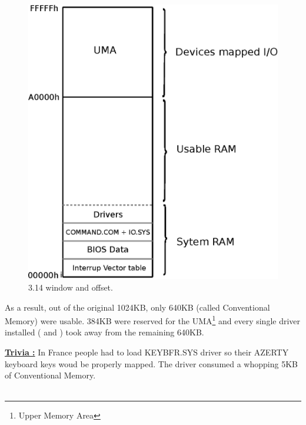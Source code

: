 \documentclass[book.tex]{subfiles}
\begin{document}
\begin{figure}[H]
\centering
\includegraphics[scale=1]{imgs/real_mode}

\caption{3.14 window and offset.}
\label{fig:fp_internals}
\end{figure}


As a result, out of the original 1024KB, only 640KB (called Conventional Memory) were usable. 384KB were reserved for the UMA\footnote{Upper Memory Area} and every single driver installed ( and )  took away from the remaining 640KB.

\bigskip

\textbf{\underline{Trivia :}}  In France people had to load KEYBFR.SYS driver so their AZERTY keyboard keys woud be properly mapped. The driver consumed a whopping 5KB of Conventional Memory.\\
\\
\end{document}
